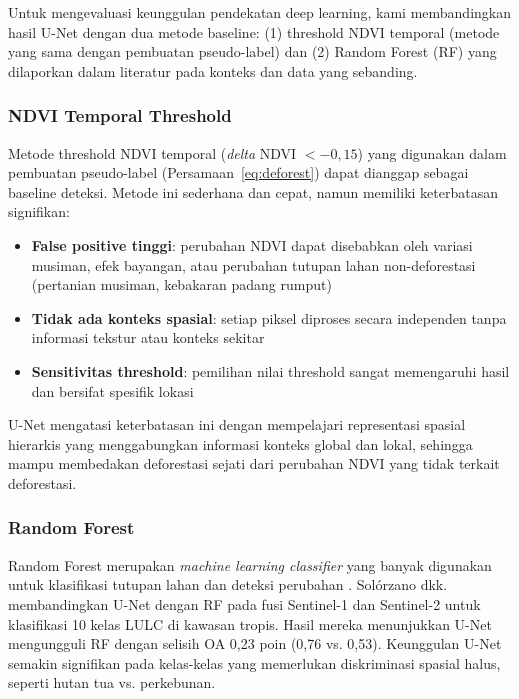\documentclass[12pt,a4paper]{article}
\begin{document}
Untuk mengevaluasi keunggulan pendekatan deep learning, kami
membandingkan hasil U-Net dengan dua metode baseline: (1) threshold
NDVI temporal (metode yang sama dengan pembuatan pseudo-label) dan
(2) Random Forest (RF) yang dilaporkan dalam literatur pada konteks
dan data yang sebanding.

\subsubsection{NDVI Temporal Threshold}
\label{subsubsec:ndvi_baseline}

Metode threshold NDVI temporal (\textit{delta} NDVI $< -0,15$)
yang digunakan dalam pembuatan pseudo-label (Persamaan~\ref{eq:deforest})
dapat dianggap sebagai baseline deteksi. Metode ini sederhana dan
cepat, namun memiliki keterbatasan signifikan:

\begin{itemize}[nosep]
    \item \textbf{False positive tinggi}: perubahan NDVI dapat
          disebabkan oleh variasi musiman, efek bayangan, atau
          perubahan tutupan lahan non-deforestasi (pertanian
          musiman, kebakaran padang rumput)
    \item \textbf{Tidak ada konteks spasial}: setiap piksel diproses
          secara independen tanpa informasi tekstur atau konteks
          sekitar
    \item \textbf{Sensitivitas threshold}: pemilihan nilai threshold
          sangat memengaruhi hasil dan bersifat spesifik lokasi
\end{itemize}

U-Net mengatasi keterbatasan ini dengan mempelajari representasi
spasial hierarkis yang menggabungkan informasi konteks global dan
lokal, sehingga mampu membedakan deforestasi sejati dari perubahan
NDVI yang tidak terkait deforestasi.

\subsubsection{Random Forest}
\label{subsubsec:rf_baseline}

Random Forest merupakan \textit{machine learning classifier} yang
banyak digunakan untuk klasifikasi tutupan lahan dan deteksi
perubahan \cite{solorzano2021lulc}. Solórzano dkk.
\cite{solorzano2021lulc} membandingkan U-Net dengan RF pada fusi
Sentinel-1 dan Sentinel-2 untuk klasifikasi 10 kelas LULC di
kawasan tropis. Hasil mereka menunjukkan U-Net mengungguli RF
dengan selisih OA 0,23 poin (0,76 vs. 0,53). Keunggulan U-Net
semakin signifikan pada kelas-kelas yang memerlukan diskriminasi
spasial halus, seperti hutan tua vs. perkebunan.
\end{document}
